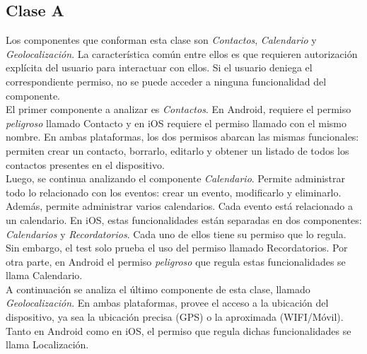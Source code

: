 \subsection{Clase A}
Los componentes que conforman esta clase son \emph{Contactos}, \emph{Calendario} y \emph{Geolocalización}. La característica común entre ellos es que requieren autorización explícita del usuario para interactuar con ellos. Si el usuario deniega el correspondiente permiso, no se puede acceder a ninguna funcionalidad del componente.\\
El primer componente a analizar es \emph{Contactos}. En Android, requiere el permiso \textit{peligroso} llamado Contacto y en iOS requiere el permiso llamado con el mismo nombre. En ambas plataformas, los dos permisos abarcan las mismas funcionales: permiten crear un contacto, borrarlo, editarlo y obtener un listado de todos los contactos presentes en el dispositivo.\\
Luego, se continua analizando el componente \emph{Calendario}. Permite administrar todo lo relacionado con los eventos: crear un evento, modificarlo y eliminarlo. Además, permite administrar varios calendarios. Cada evento está relacionado a un calendario. En iOS, estas funcionalidades están separadas en dos componentes: \emph{Calendarios} y \emph{Recordatorios}. Cada uno de ellos tiene su permiso que lo regula. Sin embargo, el test solo prueba el uso del permiso llamado Recordatorios. Por otra parte, en Android el permiso \textit{peligroso} que regula estas funcionalidades se llama Calendario.\\
A continuación se analiza el último componente de esta clase, llamado \emph{Geolocalización}. En ambas plataformas, provee el acceso a la ubicación del dispositivo, ya sea la ubicación precisa (GPS) o la aproximada (WIFI/Móvil). Tanto en Android como en iOS, el permiso que regula dichas funcionalidades se llama Localización.\\
